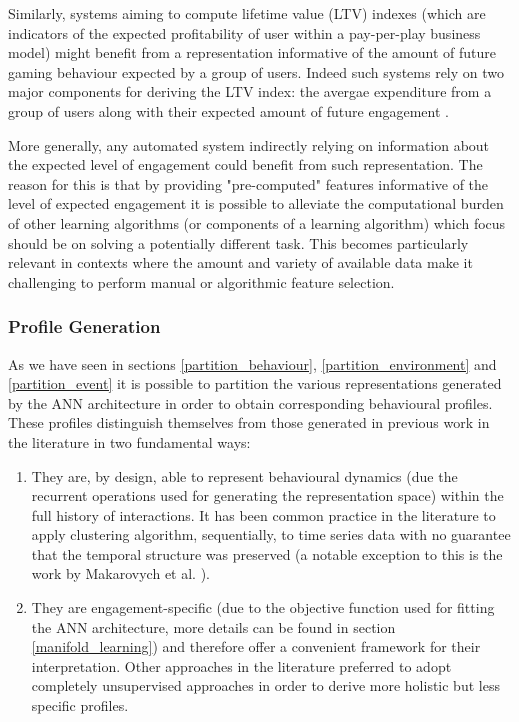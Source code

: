 Similarly, systems aiming to compute lifetime value (LTV) indexes (which are indicators of the expected profitability of user within a pay-per-play business model) might benefit from a representation informative of the  amount of future gaming behaviour expected by a group of users. Indeed such systems rely on two major components for deriving the LTV index: the avergae expenditure from a group of users along with their expected amount of future engagement \cite{chen2018customer}.

More generally, any automated system indirectly relying on information about the expected level of engagement could benefit from such representation. The reason for this is that by providing "pre-computed" features informative of the level of expected engagement it is possible to alleviate the computational burden of other learning algorithms (or components of a learning algorithm)  which focus should be on solving a potentially different task. This becomes particularly relevant in contexts where the amount and variety of available data make it challenging to perform manual or algorithmic feature selection.

\subsubsection{Profile Generation}
As we have seen in sections \ref{partition_behaviour}, \ref{partition_environment} and \ref{partition_event} it is possible to partition the various representations generated by the ANN architecture in order to obtain corresponding behavioural profiles. These profiles distinguish themselves from those generated in previous work in the literature \cite{drachen2014comparison, bauckhage2012players, makarovych2018like, aung2018predicting} in two fundamental ways:

\begin{enumerate}
    \item They are, by design, able to represent behavioural dynamics (due the recurrent operations used for generating the representation space) within the full history of interactions. It has been common practice in the literature to apply clustering algorithm, sequentially, to time series data \cite{sifa2013behavior,bauckhage2014beyond,aung2018predicting} with no guarantee that the temporal structure was preserved (a notable exception to this is the work by Makarovych et al. \cite{makarovych2018like}).
    \item They are engagement-specific (due to the objective function used for fitting the ANN architecture, more details can be found in section \ref{manifold_learning}) and therefore offer a convenient framework for their interpretation. Other approaches in the literature preferred to adopt completely unsupervised approaches \cite{drachen2014comparison, drachen2012guns} in order to derive more holistic but less specific profiles.
\end{enumerate}

